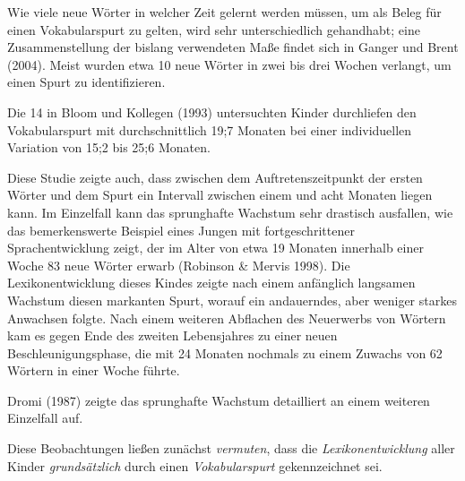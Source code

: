 \documentclass[
  letterpaper,
]{scrbook}
\begin{document}
Wie viele neue Wörter in welcher Zeit gelernt werden müssen, um als
Beleg für einen Vokabularspurt zu gelten, wird sehr unterschiedlich
gehandhabt; eine Zusammenstellung der bislang verwendeten Maße findet
sich in Ganger und Brent (2004). Meist wurden etwa 10 neue Wörter in
zwei bis drei Wochen verlangt, um einen Spurt zu identifizieren.

\begin{tcolorbox}[enhanced jigsaw, breakable, colframe=quarto-callout-note-color-frame, bottomrule=.15mm, left=2mm, opacityback=0, colback=white, rightrule=.15mm, toprule=.15mm, leftrule=.75mm, arc=.35mm]
\begin{minipage}[t]{5.5mm}
\textcolor{quarto-callout-note-color}{\faInfo}
\end{minipage}%
\begin{minipage}[t]{\textwidth - 5.5mm}

Die 14 in Bloom und Kollegen (1993) untersuchten Kinder durchliefen den
Vokabularspurt mit durchschnittlich 19;7 Monaten bei einer individuellen
Variation von 15;2 bis 25;6 Monaten.

Diese Studie zeigte auch, dass zwischen dem Auftretenszeitpunkt der
ersten Wörter und dem Spurt ein Intervall zwischen einem und acht
Monaten liegen kann. Im Einzelfall kann das sprunghafte Wachstum sehr
drastisch ausfallen, wie das bemerkenswerte Beispiel eines Jungen mit
fortgeschrittener Sprachentwicklung zeigt, der im Alter von etwa 19
Monaten innerhalb einer Woche 83 neue Wörter erwarb (Robinson \& Mervis
1998). Die Lexikonentwicklung dieses Kindes zeigte nach einem anfänglich
langsamen Wachstum diesen markanten Spurt, worauf ein andauerndes, aber
weniger starkes Anwachsen folgte. Nach einem weiteren Abflachen des
Neuerwerbs von Wörtern kam es gegen Ende des zweiten Lebensjahres zu
einer neuen Beschleunigungsphase, die mit 24 Monaten nochmals zu einem
Zuwachs von 62 Wörtern in einer Woche führte.

Dromi (1987) zeigte das sprunghafte Wachstum detailliert an einem
weiteren Einzelfall auf.

\end{minipage}%
\end{tcolorbox}

Diese Beobachtungen ließen zunächst \emph{vermuten}, dass die
\emph{Lexikonentwicklung} aller Kinder \emph{grundsätzlich} durch einen
\emph{Vokabularspurt} gekennzeichnet sei.
\end{document}
